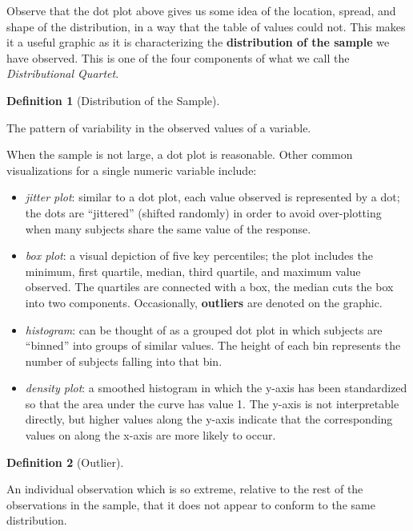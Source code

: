 \documentclass[
  letterpaper,
  DIV=11,
  numbers=noendperiod]{scrreprt}
\providecommand{\tightlist}{%
  \setlength{\itemsep}{0pt}\setlength{\parskip}{0pt}}\usepackage{longtable,booktabs,array}
\theoremstyle{plain}
\theoremstyle{definition}
\theoremstyle{definition}
\newtheorem{definition}{Definition}[chapter]
\theoremstyle{remark}
\begin{document}
Observe that the dot plot above gives us some idea of the location,
spread, and shape of the distribution, in a way that the table of values
could not. This makes it a useful graphic as it is characterizing the
\textbf{distribution of the sample} we have observed. This is one of the
four components of what we call the \emph{Distributional Quartet}.

\begin{definition}[Distribution of the
Sample]\protect\hypertarget{def-distribution-sample}{}\label{def-distribution-sample}

The pattern of variability in the observed values of a variable.

\end{definition}

When the sample is not large, a dot plot is reasonable. Other common
visualizations for a single numeric variable include:

\begin{itemize}
\tightlist
\item
  \emph{jitter plot}: similar to a dot plot, each value observed is
  represented by a dot; the dots are ``jittered'' (shifted randomly) in
  order to avoid over-plotting when many subjects share the same value
  of the response.
\item
  \emph{box plot}: a visual depiction of five key percentiles; the plot
  includes the minimum, first quartile, median, third quartile, and
  maximum value observed. The quartiles are connected with a box, the
  median cuts the box into two components. Occasionally,
  \textbf{outliers} are denoted on the graphic.
\item
  \emph{histogram}: can be thought of as a grouped dot plot in which
  subjects are ``binned'' into groups of similar values. The height of
  each bin represents the number of subjects falling into that bin.
\item
  \emph{density plot}: a smoothed histogram in which the y-axis has been
  standardized so that the area under the curve has value 1. The y-axis
  is not interpretable directly, but higher values along the y-axis
  indicate that the corresponding values on along the x-axis are more
  likely to occur.
\end{itemize}

\begin{definition}[Outlier]\protect\hypertarget{def-outlier}{}\label{def-outlier}

An individual observation which is so extreme, relative to the rest of
the observations in the sample, that it does not appear to conform to
the same distribution.

\end{definition}
\end{document}
